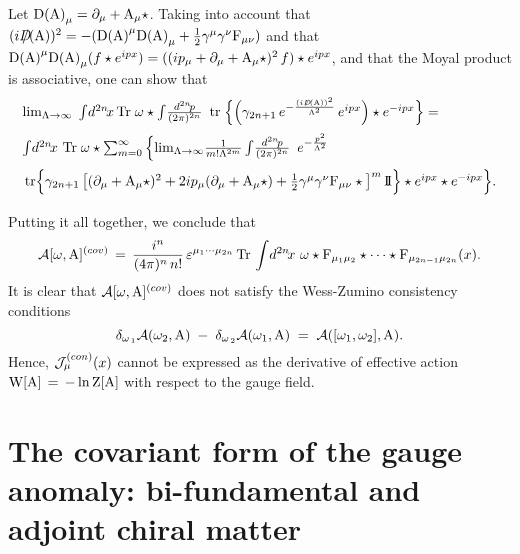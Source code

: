 \documentclass[a4paper,12pt]{article}
\def\cA{{\cal A}}
\def\cJ{{\cal J}}
\def\A{{\rm A}}
\def\F{{\rm F}}
\def\W{{\rm W}}
\def\Z{{\rm Z}}
\def\Dirac{{D\mkern-12mu/}}
\def\idpn{\int\! \frac{d^{2n}\!p}{(2\pi)^{2n}} \,\,}
\def\idxn{\int\! d^{2n}\!x \,}
\def\unit{{\rm I\!\!\, I}}
\begin{document}
Let ${\rm D(\A)}_{\mu}=\partial_{\mu}+\A_{\mu}\star$. Taking into account that 
$(i\Dirac(\A))^2=-({\rm D(\A)}^{\mu}{\rm D(\A)}_{\mu}+
\frac{1}{2}\gamma^{\mu}\gamma^{\nu}{\rm F}_{\mu\nu})$ and that  
${\rm D(\A)}^{\mu}{\rm D(\A)}_{\mu}(f\star e^{ipx})=
((ip_{\mu}+\partial_{\mu}+\A_{\mu}\star)^2\,f)\star e^{ipx}$, and that the
Moyal product is associative,  one can  show that
\begin{displaymath}
\begin{array}{l}
{\mbox{lim}_{\Lambda\rightarrow\infty}\;
\idxn {\rm Tr}\;\omega\star\idpn\,{\rm tr}\;\Big\{
\Big(\gamma_{2n+1}\,e^{-\frac{(i\Dirac(\A))^2}{\Lambda^2}}\,e^{ipx}\Big)\star
e^{-ipx}\Big\}=}\\[9pt]
{\idxn\, {\rm Tr}\;\omega\star\sum_{m=0}^{\infty}\Big\{ 
\mbox{lim}_{\Lambda\rightarrow\infty}\frac{1}{m!\Lambda^{2m}}\idpn\, 
e^{-\frac{p^2}{\Lambda^2}}}\\[9pt]
{\,{\rm tr}
\Big\{\gamma_{2n+1}\,\big[(\partial_{\mu}+\A_{\mu}\star)^2+2ip_{\mu}(\partial_{\mu}+\A_{\mu}\star)+\frac{1}{2}
\gamma^{\mu}\gamma^{\nu}{\rm F}_{\mu\nu}\star\big]^m\,\unit\Big\}\star e^{ipx}
\star e^{-ipx}\Big\}.}\\[9pt]
\end{array}
\end{displaymath}
Putting it all together, we conclude that 
\begin{displaymath}
\cA[\omega,\A]^{(cov)}\,=\,
\frac{i^n}{(4\pi)^n\,n!}\,\varepsilon^{\mu_1\cdots\mu_{2n}}\,{\rm Tr}\,\idxn\,
\omega\star\F_{\mu_1\mu_2}\star\cdots\star\F_{\mu_{2n-1}\mu_{2n}}(x).
\end{displaymath}
It is clear that $\cA[\omega,\A]^{(cov)}$ does not satisfy the Wess-Zumino 
consistency conditions
\begin{displaymath}
\delta_{\omega_{\,1}}\cA(\omega_{2},\A)\;-\;
\delta_{\omega_{\,2}}\cA(\omega_1,\A)\;=\;
\cA([\omega_1,\omega_2],\A).
\end{displaymath}
Hence, $\cJ^{(con)}_{\mu}(x)$ cannot be expressed as the derivative of 
effective action $\W[\A]\,=\,-\ln \Z[\A]$ with respect to the gauge field.

\section{The covariant form of the gauge anomaly: bi-fundamental and adjoint chiral matter}
\end{document}
